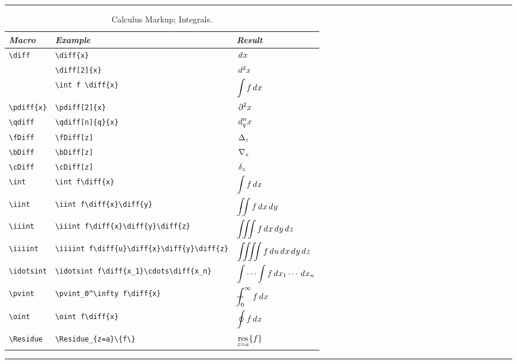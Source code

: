 \documentclass[twoside]{article}
\newenvironment{Table}[1]{%
   \begin{table}[htb]\hrule\begin{centering}\caption{#1}}{%
   \par\end{centering}\hrule\end{table}}
\newenvironment{Tabular}[1]{%
   \begingroup\def\arraystretch{1.3}\small \begin{tabular}{#1}}{%
   \end{tabular}\endgroup}
\begin{document}
\begin{Table}{Calculus Markup; Integrals\label{tab:intmarkup}.}
\begin{Tabular}{lll}
\textit{Macro} & \textit{Example} & \textit{Result} \\\hline
\verb|\diff| & \verb|\diff{x}| & $\displaystyle\diff{x}$ \\
     & \verb|\diff[2]{x}| & $\displaystyle\diff[2]{x}$ \\
     & \verb|\int f \diff{x}| & $\displaystyle\int f \diff{x}$\\
\verb|\pdiff{x}| & \verb|\pdiff[2]{x}| & $\displaystyle\pdiff[2]{x}$ \\
\verb|\qdiff| & \verb|\qdiff[n]{q}{x}| & $\displaystyle\qdiff[n]{q}{x}$ \\
\verb|\fDiff| & \verb|\fDiff[z]| & $\displaystyle\fDiff[z]$ \\
\verb|\bDiff| & \verb|\bDiff[z]| & $\displaystyle\bDiff[z]$ \\
\verb|\cDiff| & \verb|\cDiff[z]| & $\displaystyle\cDiff[z]$ \\
\hline
\verb|\int|  & \verb|\int f\diff{x}| 
    & $\displaystyle\int f\diff{x}$\\
\verb|\iint|  & \verb|\iint f\diff{x}\diff{y}| 
    & $\displaystyle\iint f\diff{x}\diff{y}$\\
\verb|\iiint|  & \verb|\iiint f\diff{x}\diff{y}\diff{z}| 
    & $\displaystyle\iiint f\diff{x}\diff{y}\diff{z}$\\
\verb|\iiiint|  & \verb|\iiiint f\diff{u}\diff{x}\diff{y}\diff{z}| 
    & $\displaystyle\iiiint f\diff{u}\diff{x}\diff{y}\diff{z}$\\
\verb|\idotsint|  & \verb|\idotsint f\diff{x_1}\cdots\diff{x_n}| 
    & $\displaystyle\idotsint f\diff{x_1}\cdots\diff{x_n}$\\
\verb|\pvint| & \verb|\pvint_0^\infty f\diff{x}|&
     $\displaystyle\pvint_0^\infty f\diff{x}$\\
\verb|\oint| & \verb|\oint f\diff{x}|& $\displaystyle\oint f\diff{x}$\\
\hline
\verb|\Residue| & \verb|\Residue_{z=a}\{f\}| 
    & $\displaystyle\Residue_{z=a}\{f\}$ \\
\end{Tabular}
\end{Table}
\end{document}
